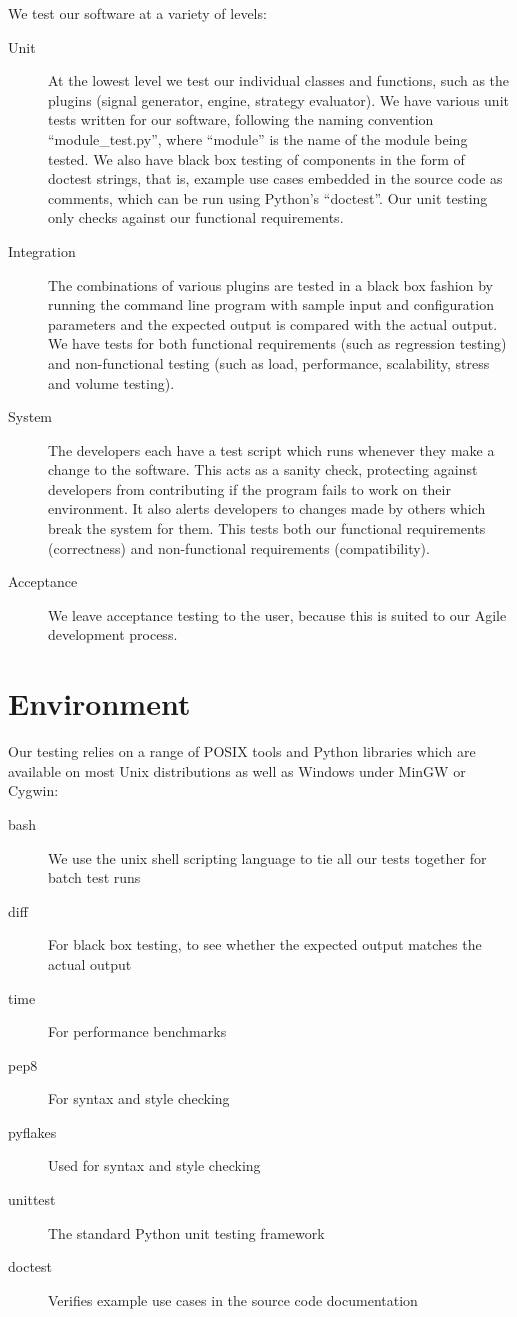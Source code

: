 \documentclass{article}
\begin{document}
We test our software at a variety of levels:
\begin{description}
  \item[Unit] At the lowest level we test our individual classes and functions, such as the plugins (signal generator, engine, strategy evaluator). We have various unit tests written for our software, following the naming convention ``module\_test.py'', where ``module'' is the name of the module being tested. We also have black box testing of components in the form of doctest strings, that is, example use cases embedded in the source code as comments, which can be run using Python's ``doctest''. Our unit testing only checks against our functional requirements.
  \item[Integration] The combinations of various plugins are tested in a black box fashion by running the command line program with sample input and configuration parameters and the expected output is compared with the actual output. We have tests for both functional requirements (such as regression testing) and non-functional testing (such as load, performance, scalability, stress and volume testing).
  \item[System] The developers each have a test script which runs whenever they make a change to the software. This acts as a sanity check, protecting against developers from contributing if the program fails to work on their environment. It also alerts developers to changes made by others which break the system for them. This tests both our functional requirements (correctness) and non-functional requirements (compatibility).
  \item[Acceptance] We leave acceptance testing to the user, because this is suited to our Agile development process.
\end{description}

\section{Environment}


Our testing relies on a range of POSIX tools and Python libraries which are available on most Unix distributions as well as Windows under MinGW or Cygwin:
\begin{description}
  \item[bash] We use the unix shell scripting language to tie all our tests together for batch test runs
  \item[diff] For black box testing, to see whether the expected output matches the actual output
  \item[time] For performance benchmarks
  \item[pep8] For syntax and style checking
  \item[pyflakes] Used for syntax and style checking
  \item[unittest] The standard Python unit testing framework
  \item[doctest] Verifies example use cases in the source code documentation
\end{description}
\end{document}
